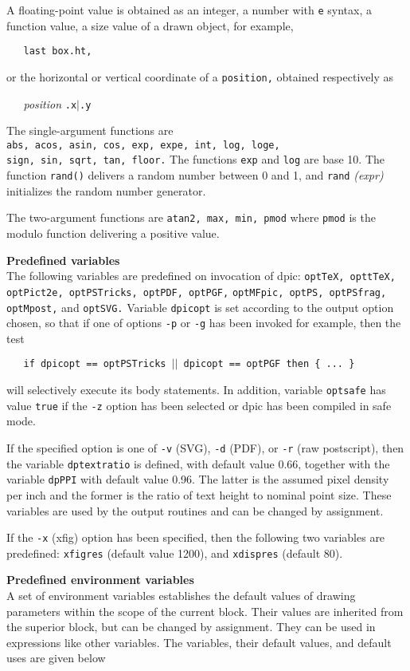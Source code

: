 A floating-point value is obtained as
an integer, a number with
{\tt e}
syntax, a function value, a size value of a drawn object, for example,

{\tt \ \ \ last\ box.ht,}

or the horizontal or vertical coordinate of a
{\tt position,}
obtained respectively as

{\it \ \ \ position}
{\tt .x$|$.y}

The single-argument functions are
{\tt abs,\ acos,\ asin,\ cos,\ exp,\ expe,\ int,\ log,\ loge,}
{\tt sign,\ sin,\ sqrt,\ tan,\ floor.}
The functions
{\tt exp}
and
{\tt log}
are base 10.
The function
{\tt rand()}
delivers a random number between 0 and 1, and
{\tt rand}
{\it (expr)}
initializes the random number generator.

The two-argument functions are
{\tt atan2,\ max,\ min,\ pmod}
where
{\tt pmod}
is the modulo function delivering a positive value.
\par\hskip-2pc{\bf Predefined variables}\\
The following variables are predefined on invocation of dpic:
{\tt optTeX, opttTeX, optPict2e, optPSTricks, optPDF, optPGF,}
{\tt optMFpic, optPS, optPSfrag,}
\\\hbox{}\hskip-1pt
{\tt optMpost,}
and
{\tt optSVG.}
Variable
{\tt dpicopt}
is set according to the output option chosen, so that if one of options
{\tt -p}
or
{\tt -g}
has been invoked for example, then the test

{\tt \ \ \ if\ dpicopt\ ==\ optPSTricks\ $|$$|$\ dpicopt\ ==\ optPGF\ then\ \{\ ...\ \}}

will selectively execute its body statements.
In addition, variable
{\tt optsafe}
has value
{\tt true}
if the
{\tt -z}
option has been selected or dpic has been compiled in safe mode.

If the specified option is one of
{\tt -v}
(SVG),
{\tt -d}
(PDF), or
{\tt -r}
(raw postscript), then
the variable
{\tt dptextratio}
is defined, with default value 0.66, together with the variable
{\tt dpPPI}
with default value 0.96.  The latter is the assumed pixel density per inch
and the former is the ratio of text height to nominal point size.
These variables are used by the output routines and can be
changed by assignment.

If the
{\tt -x}
(xfig) option has been specified,
then the following two variables are predefined:
{\tt xfigres}
(default value 1200), and
{\tt xdispres}
(default 80).
\par\hskip-2pc{\bf Predefined environment variables}\\
A set of environment variables establishes the default values of drawing
parameters within the scope of the current block.
Their values are inherited from the superior block, but can be changed
by assignment.
They can be used in expressions like other variables.
The variables, their default values, and default uses are given below


